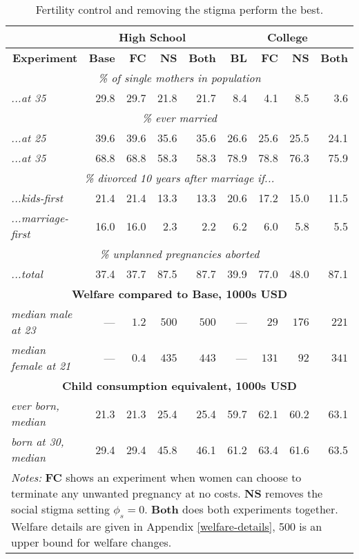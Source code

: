 \documentclass[12pt,letter]{article}
\begin{document}
\begin{table}[h]
\begin{center}
\caption{Fertility control and removing the stigma perform the best.\label{promoting-table}}
\begin{tabular}{l | r r r r | r r  rr}\hline
& \multicolumn{4}{c|}{\textbf{High School}} & \multicolumn{4}{c}{\textbf{College}} \\\hline
\multicolumn{1}{r|}{\textbf{Experiment}}& \textbf{Base} & \textbf{FC} & \textbf{NS}  & \textbf{Both} & \textbf{BL} & \textbf{FC} & \textbf{NS}  &  \textbf{Both} \\\hline
\multicolumn{9}{c}{\emph{\% of single mothers in population}} \\\hline
\textit{...at 35}  & 29.8 & 29.7 & 21.8 & 21.7 & 8.4 & 4.1 & 8.5 & 3.6\\\hline
\multicolumn{9}{c}{\emph{\% ever married}} \\\hline
\textit{...at 25}  & 39.6 & 39.6 & 35.6 & 35.6 & 26.6 & 25.6 & 25.5 & 24.1 \\
\textit{...at 35}  & 68.8 & 68.8 & 58.3 & 58.3 & 78.9 & 78.8 & 76.3 & 75.9 \\\hline
\multicolumn{9}{c}{\emph{\% divorced 10 years after marriage if...}} \\\hline
\textit{...kids-first}  & 21.4 & 21.4 & 13.3 & 13.3 & 20.6 & 17.2 & 15.0 & 11.5\\
\textit{...marriage-first}  & 16.0 & 16.0 & 2.3 & 2.2 & 6.2 & 6.0 & 5.8 & 5.5\\\hline
\multicolumn{9}{c}{\emph{\% unplanned pregnancies aborted}} \\\hline
\textit{...total}  & 37.4 & 37.7 & 87.5 & 87.7 & 39.9 & 77.0 & 48.0 & 87.1\\\hline
\multicolumn{9}{c}{\footnotesize \textbf{Welfare compared to Base, 1000s USD}}\\\hline
\textit{median male at 23}  & --- & $1.2$ & $500$ & $500$ & --- & $29$ & $176$ & $221$ \\
\textit{median female at 21} & --- & $0.4$ & $435$ & $443$ & --- & $131$ & $92$ & $341$\\\hline
\multicolumn{9}{c}{\footnotesize \textbf{Child consumption equivalent, 1000s USD}}\\\hline
\textit{ever born, median}  & 21.3 & 21.3 & 25.4 & 25.4 & 59.7 & 62.1 & 60.2 & 63.1\\
\textit{born at 30, median}  & 29.4 & 29.4 & 45.8 & 46.1 & 61.2 & 63.4 & 61.6 & 63.5\\\hline
\multicolumn{9}{p{0.85\linewidth}}{\footnotesize \emph{Notes:} \textbf{FC} shows an experiment when women can choose to terminate any unwanted pregnancy at no costs. \textbf{NS} removes the social stigma setting $\phi_s = 0$. \textbf{Both} does both experiments together. Welfare details are given in Appendix \ref{welfare-details}, 500 is an upper bound for welfare changes.}\\\hline\hline
\end{tabular}
\end{center}
\end{table}
\end{document}
